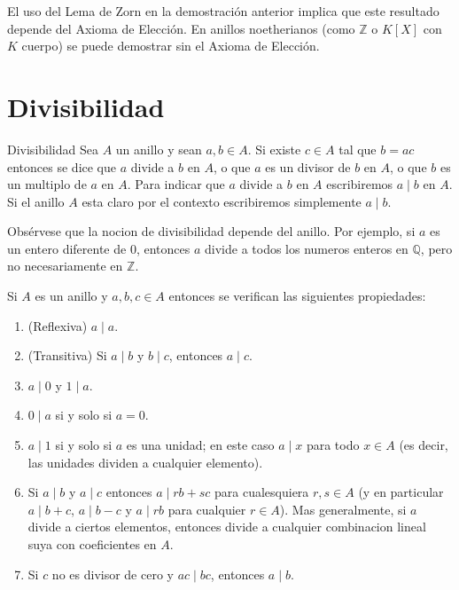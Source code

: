 \begin{remark}
El uso del Lema de Zorn en la demostración anterior implica que este resultado depende del Axioma de Elección. En anillos noetherianos (como \(\mathbb{Z}\) o \(K[X]\) con \(K\) cuerpo) se puede demostrar sin el Axioma de Elección.
\end{remark}

\clearpage
\section{Divisibilidad}

\begin{definition}{Divisibilidad}{}
Sea \(A\) un anillo y sean \(a, b \in A\). Si existe \(c \in A\) tal que \(b = ac\) entonces se dice que \(a\) divide a \(b\) en \(A\), o que \(a\) es un divisor de \(b\) en \(A\), o que \(b\) es un multiplo de \(a\) en \(A\). Para indicar que \(a\) divide a \(b\) en \(A\) escribiremos \(a \mid b\) en \(A\). Si el anillo \(A\) esta claro por el contexto escribiremos simplemente \(a \mid b\).
\end{definition}

Obsérvese que la nocion de divisibilidad depende del anillo. Por ejemplo, si \(a\) es un entero diferente de \(0\), entonces \(a\) divide a todos los numeros enteros en \(\mathbb{Q}\), pero no necesariamente en \(\mathbb{Z}\).

\begin{lemma}{}{}
Si \(A\) es un anillo y \(a, b, c \in A\) entonces se verifican las siguientes propiedades:

\begin{enumerate}
\item (Reflexiva) \(a \mid a\).

\item (Transitiva) Si \(a \mid b\) y \(b \mid c\), entonces \(a \mid c\).

\item \(a \mid 0\) y \(1 \mid a\).

\item \(0 \mid a\) si y solo si \(a = 0\).

\item \(a \mid 1\) si y solo si \(a\) es una unidad; en este caso \(a \mid x\) para todo \(x \in A\) (es decir, las unidades dividen a cualquier elemento).

\item Si \(a \mid b\) y \(a \mid c\) entonces \(a \mid rb + sc\) para cualesquiera \(r, s \in A\) (y en particular \(a \mid b + c\), \(a \mid b - c\) y \(a \mid rb\) para cualquier \(r \in A\)). Mas generalmente, si \(a\) divide a ciertos elementos, entonces divide a cualquier combinacion lineal suya con coeficientes en \(A\).

\item Si \(c\) no es divisor de cero y \(ac \mid bc\), entonces \(a \mid b\).
\end{enumerate}
\end{lemma}

